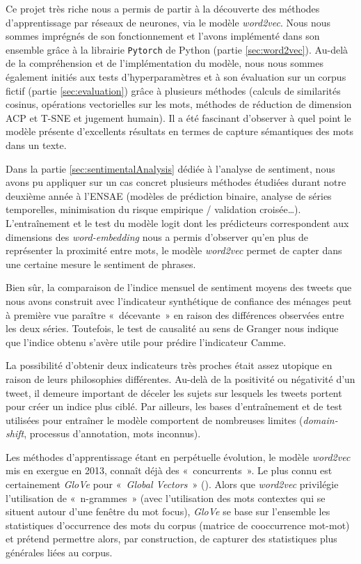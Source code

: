 \documentclass[11pt,french,french]{article}
\begin{document}
Ce projet très riche nous a permis de partir à la découverte des méthodes d'apprentissage par réseaux de neurones, via le modèle \emph{word2vec}.
Nous nous sommes imprégnés de son fonctionnement et l'avons implémenté dans son ensemble grâce à la librairie \texttt{Pytorch} de Python (partie \ref{sec:word2vec}).
Au-delà de la compréhension et de l'implémentation du modèle, nous nous sommes également initiés aux tests d'hyperparamètres et à son évaluation sur un corpus fictif (partie \ref{sec:evaluation}) grâce à plusieurs méthodes (calculs de similarités cosinus, opérations vectorielles sur les mots, méthodes de réduction de dimension ACP et T-SNE et jugement humain).
Il a été fascinant d'observer à quel point le modèle présente d'excellents résultats en termes de capture sémantiques des mots dans un texte.

Dans la partie \ref{sec:sentimentalAnalysis} dédiée à l'analyse de sentiment, nous avons pu appliquer sur un cas concret plusieurs méthodes étudiées durant notre deuxième année à l'ENSAE (modèles de prédiction binaire, analyse de séries temporelles, minimisation du risque empirique / validation croisée\dots).
L'entraînement et le test du modèle logit dont les prédicteurs correspondent aux dimensions des \emph{word-embedding} nous a permis d'observer qu'en plus de représenter la proximité entre mots, le modèle \emph{word2vec} permet de capter dans une certaine mesure le sentiment de phrases.

Bien sûr, la comparaison de l'indice mensuel de sentiment moyens des tweets que nous avons construit avec l'indicateur synthétique de confiance des ménages peut à première vue paraître «~décevante~» en raison des différences observées entre les deux séries.
Toutefois, le test de causalité au sens de Granger nous indique que l'indice obtenu s'avère utile pour prédire l'indicateur Camme.

La possibilité d'obtenir deux indicateurs très proches était assez utopique en raison de leurs philosophies différentes.
Au-delà de la positivité ou négativité d'un tweet, il demeure important de déceler les sujets sur lesquels les tweets portent pour créer un indice plus ciblé.
Par ailleurs, les bases d'entraînement et de test utilisées pour entraîner le modèle comportent de nombreuses limites (\emph{domain-shift}, processus d'annotation, mots inconnus).

Les méthodes d'apprentissage étant en perpétuelle évolution, le modèle \emph{word2vec} mis en exergue en 2013, connaît déjà des «~concurrents~». Le plus connu est certainement \emph{GloVe} pour «~\emph{Global Vectors}~» (\cite{Pennington}).
Alors que \emph{word2vec} privilégie l'utilisation de «~n-grammes~» (avec l'utilisation des mots contextes qui se situent autour d'une fenêtre du mot focus), \emph{GloVe} se base sur l'ensemble les statistiques d'occurrence des mots du corpus (matrice de cooccurrence mot-mot) et prétend permettre alors, par construction, de capturer des statistiques plus générales liées au corpus.
\end{document}
